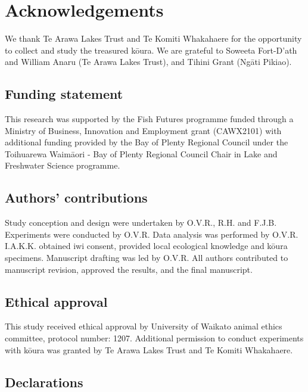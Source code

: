 \documentclass[
  12pt,
  a4paper,
]{scrbook}
\begin{document}

\chapter{Acknowledgements}\label{acknowledgements-2}

We thank Te Arawa Lakes Trust and Te Komiti Whakahaere for the
opportunity to collect and study the treasured kōura. We are grateful to
Soweeta Fort-D'ath and William Anaru (Te Arawa Lakes Trust), and Tihini
Grant (Ngāti Pikiao).

\section{Funding statement}\label{funding-statement-2}

This research was supported by the Fish Futures programme funded through
a Ministry of Business, Innovation and Employment grant (CAWX2101) with
additional funding provided by the Bay of Plenty Regional Council under
the Toihuarewa Waimāori - Bay of Plenty Regional Council Chair in Lake
and Freshwater Science programme.

\section{Authors' contributions}\label{authors-contributions-2}

Study conception and design were undertaken by O.V.R., R.H. and F.J.B.
Experiments were conducted by O.V.R. Data analysis was performed by
O.V.R. I.A.K.K. obtained iwi consent, provided local ecological
knowledge and kōura specimens. Manuscript drafting was led by O.V.R. All
authors contributed to manuscript revision, approved the results, and
the final manuscript.

\section{Ethical approval}\label{ethical-approval-2}

This study received ethical approval by University of Waikato animal
ethics committee, protocol number: 1207. Additional permission to
conduct experiments with kōura was granted by Te Arawa Lakes Trust and
Te Komiti Whakahaere.

\section{Declarations}\label{declarations-2}
\end{document}

